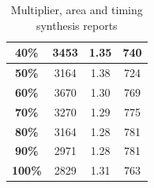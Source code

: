 \documentclass[a4paper]{article}
\begin{document}
\begin{table}[hbtp]
\begin{tabular}{|c|c|c|c|}
		\textbf{40\%}                                                                   & 		3453                                                                       & 		1.35                                                                       & 		740                                                                                  \\ \hline
		\textbf{50\%}                                                                   & 		3164                                                                       & 		1.38                                                                       & 		724                                                                                  \\ \hline
		\textbf{60\%}                                                                   & 		3670                                                                       & 		1.30                                                                       & 		769                                                                                  \\ \hline
		\textbf{70\%}                                                                   & 		3270                                                                       & 		1.29                                                                       & 		775                                                                                  \\ \hline
		\textbf{80\%}                                                                   & 		3164                                                                       & 		1.28                                                                       & 		781                                                                                  \\ \hline
		\textbf{90\%}                                                                   & 		2971                                                                       & 		1.28                                                                       & 		781                                                                                  \\ \hline
		\textbf{100\%}                                                                  & 		2829                                                                       & 		1.31                                                                       & 		763                                                                                  \\ \hline
		\end{tabular}
		\caption{Multiplier, area and timing synthesis reports}
		\label{tab:mult_syn}
	\end{table}
\end{document}
